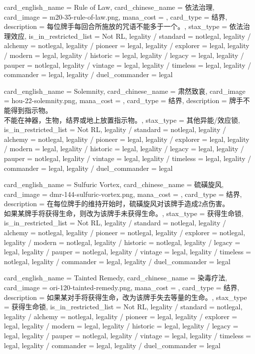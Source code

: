 \documentclass[lang = cn, color = black, 10pt]{AllThatStax}
\begin{document}
\card
{
	card_english_name = {Rule of Law},
	card_chinese_name = {依法治理},
	card_image = m20-35-rule-of-law.png,
	mana_cost = ,
	card_type = 结界,
	description = {每位牌手每回合所施放的咒语不能多于一个。},
	stax_type = 依法治理效应,
	is_in_restricted_list = Not RL,
	legality / standard = notlegal,
	legality / alchemy = notlegal,
	legality / pioneer = legal,
	legality / explorer = legal,
	legality / modern = legal,
	legality / historic = legal,
	legality / legacy = legal,
	legality / pauper = notlegal,
	legality / vintage = legal,
	legality / timeless = legal,
	legality / commander = legal,
	legality / duel_commander = legal
}

\card
{
	card_english_name = {Solemnity},
	card_chinese_name = {肃然致哀},
	card_image = hou-22-solemnity.png,
	mana_cost = ,
	card_type = 结界,
	description = {牌手不能得到指示物。\\
		不能在神器，生物，结界或地上放置指示物。},
	stax_type = 其他异能/效应锁,
	is_in_restricted_list = Not RL,
	legality / standard = notlegal,
	legality / alchemy = notlegal,
	legality / pioneer = legal,
	legality / explorer = legal,
	legality / modern = legal,
	legality / historic = legal,
	legality / legacy = legal,
	legality / pauper = notlegal,
	legality / vintage = legal,
	legality / timeless = legal,
	legality / commander = legal,
	legality / duel_commander = legal
}

\card
{
	card_english_name = {Sulfuric Vortex},
	card_chinese_name = {硫磺旋风},
	card_image = dmr-144-sulfuric-vortex.png,
	mana_cost = ,
	card_type = 结界,
	description = {在每位牌手的维持开始时，硫磺旋风对该牌手造成2点伤害。\\
		如果某牌手将获得生命，则改为该牌手未获得生命。},
	stax_type = 获得生命锁,
	is_in_restricted_list = Not RL,
	legality / standard = notlegal,
	legality / alchemy = notlegal,
	legality / pioneer = notlegal,
	legality / explorer = notlegal,
	legality / modern = notlegal,
	legality / historic = notlegal,
	legality / legacy = legal,
	legality / pauper = notlegal,
	legality / vintage = legal,
	legality / timeless = notlegal,
	legality / commander = legal,
	legality / duel_commander = legal
}

\card
{
	card_english_name = {Tainted Remedy},
	card_chinese_name = {染毒疗法},
	card_image = ori-120-tainted-remedy.png,
	mana_cost = ,
	card_type = 结界,
	description = {如果某对手将获得生命，改为该牌手失去等量的生命。},
	stax_type = 获得生命锁,
	is_in_restricted_list = Not RL,
	legality / standard = notlegal,
	legality / alchemy = notlegal,
	legality / pioneer = legal,
	legality / explorer = legal,
	legality / modern = legal,
	legality / historic = legal,
	legality / legacy = legal,
	legality / pauper = notlegal,
	legality / vintage = legal,
	legality / timeless = legal,
	legality / commander = legal,
	legality / duel_commander = legal
}
\end{document}
